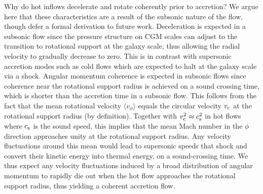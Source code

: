 \documentclass[fleqn,usenatbib]{mnras}
\begin{document}



Why do hot inflows decelerate and rotate coherently prior to accretion?
We argue here that these characteristics are a result of the subsonic nature of the flow, though defer a formal derivation to future work. 
Deceleration is expected in a subsonic flow since the pressure structure on CGM scales can adjust to the transition to rotational support at the galaxy scale, thus allowing the radial velocity to gradually decrease to zero.
This is in contrast with supersonic accretion modes such as cold flows which are expected to halt at the galaxy scale via a shock. 
Angular momentum coherence is expected in subsonic flows since coherence near the rotational support radius is achieved on a sound crossing time, which is shorter than the accretion time in a subsonic flow.
This follows from the fact that the mean rotational velocity $\langle v_\phi \rangle$ equals the circular velocity $v_{\rm c}$ at the rotational support radius (by definition).
Together with  $v_{\rm c}^2\approx c_{\rm s}^2$ in hot flows where $c_{\rm s}$ is the sound speed, this implies that the mean Mach number in the $\phi$ direction approaches unity at the rotational support radius.
Any velocity fluctuations around this mean would lead to supersonic speeds that shock and convert their kinetic energy into thermal energy, on a sound-crossing time.
We thus expect any velocity fluctuations induced by a broad distribution of angular momentum to rapidly die out when the hot flow approaches the rotational support radius, thus yielding a coherent accretion flow.
\end{document}

